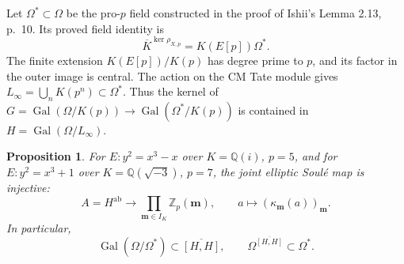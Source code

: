 \documentclass[11pt]{article}
\newtheorem{proposition}[theorem]{Proposition}
\theoremstyle{definition}\newtheorem{definition}[theorem]{Definition}
\begin{document}
Let \(\Omega^*\subset\Omega\) be the pro-\(p\) field constructed
in the proof of Ishii's Lemma 2.13, p.~10. Its proved field
identity is
\[
 \overline K^{\ker\rho_{X,p}}=K(E[p])\Omega^* .
\]
The finite extension \(K(E[p])/K(p)\) has degree prime to \(p\),
and its factor in the outer image is central. The action on
the CM Tate module gives \(L_\infty=\bigcup_nK(p^n)\subset\Omega^*\).
Thus the kernel of \(G=\operatorname{Gal}(\Omega/K(p))
\to\operatorname{Gal}(\Omega^*/K(p))\) is contained in
\(H=\operatorname{Gal}(\Omega/L_\infty)\).

\begin{proposition}\label{prop:cm-abelian-detection}
For \(E:y^2=x^3-x\) over \(K=\mathbb Q(i)\), \(p=5\), and
for \(E:y^2=x^3+1\) over \(K=\mathbb Q(\sqrt{-3})\), \(p=7\),
the joint elliptic Soul\'e map is injective:
\[
 A=H^{\mathrm{ab}}
   \longrightarrow\prod_{\boldsymbol m\in I_K}
                 \mathbb Z_p(\boldsymbol m),
 \qquad a\longmapsto(\kappa_{\boldsymbol m}(a))_{\boldsymbol m}.
\]
In particular,
\[
 \operatorname{Gal}(\Omega/\Omega^*)\subset
       \overline{[H,H]},
 \qquad
 \Omega^{\overline{[H,H]}}\subset\Omega^* .
\]
\end{proposition}
\end{document}
